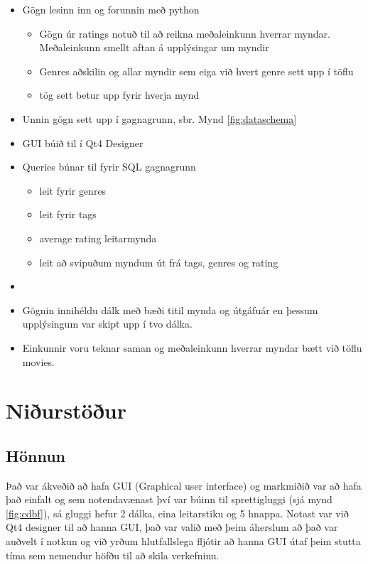 \documentclass[12pt, git, draft]{rureport}
\begin{document}
\begin{itemize}
	\item Gögn lesinn inn og forunnin með python
	\begin{itemize}
		\item Gögn úr ratings notuð til að reikna meðaleinkunn hverrar myndar. Meðaleinkunn smellt aftan á upplýsingar um myndir
		\item Genres aðskilin og allar myndir sem eiga við hvert genre sett upp í töflu
		\item tög sett betur upp fyrir hverja mynd
	\end{itemize}
	\item Unnin gögn sett upp í gagnagrunn, sbr. Mynd \ref{fig:dataschema}
	\item GUI búið til í Qt4 Designer \cite{qt4}
	\item Queries búnar til fyrir SQL gagnagrunn
	\begin{itemize}
		\item leit fyrir genres
		\item leit fyrir tags
		\item average rating leitarmynda
		\item leit að svipuðum myndum út frá tags, genres og rating
	\end{itemize}
	\item 
	\item Gögnin innihéldu dálk með bæði titil mynda og útgáfuár en þessum upplýsingum var skipt upp í tvo dálka.
	\item Einkunnir voru teknar saman og meðaleinkunn hverrar myndar bætt við töflu movies.
\end{itemize}
 

\section{Niðurstöður}\label{nidurstodur}
\subsection{Hönnun}
Það var ákveðið að hafa GUI (Graphical user interface) og markmiðið var að hafa það einfalt og sem notendavænast því var búinn til sprettigluggi (sjá mynd \ref{fig:cdbf}), sá gluggi hefur 2 dálka, eina leitarstiku og 5 hnappa. Notast var við Qt4 designer til að hanna GUI, það var valið með þeim áherslum að það var auðvelt í notkun og við yrðum hlutfallslega fljótir að hanna GUI útaf þeim stutta tíma sem nemendur höfðu til að skila verkefninu.
\end{document}
